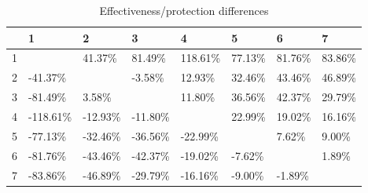 \begin{table}[ht]
\centering
\begin{tabular}{rlllllll}
  \hline
 & 1 & 2 & 3 & 4 & 5 & 6 & 7 \\ 
  \hline
1 &  & 41.37\% & 81.49\% & 118.61\% & 77.13\% & 81.76\% & 83.86\% \\ 
  2 & -41.37\% &  & -3.58\% & 12.93\% & 32.46\% & 43.46\% & 46.89\% \\ 
  3 & -81.49\% & 3.58\% &  & 11.80\% & 36.56\% & 42.37\% & 29.79\% \\ 
  4 & -118.61\% & -12.93\% & -11.80\% &  & 22.99\% & 19.02\% & 16.16\% \\ 
  5 & -77.13\% & -32.46\% & -36.56\% & -22.99\% &  & 7.62\% & 9.00\% \\ 
  6 & -81.76\% & -43.46\% & -42.37\% & -19.02\% & -7.62\% &  & 1.89\% \\ 
  7 & -83.86\% & -46.89\% & -29.79\% & -16.16\% & -9.00\% & -1.89\% &  \\ 
   \hline
\end{tabular}
\caption{Effectiveness/protection differences} 
\end{table}

